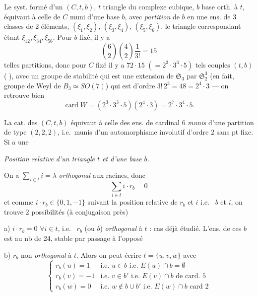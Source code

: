 \documentclass[11pt,a4paper]{article}
\begin{document}

Le syst. formé d'un $(C, t, b)$, $t$ triangle du complexe cubique, $b$ base
orth. à $t$, équivaut à celle de $C$ muni d'une base $b$, avec
\emph{partition} de $b$ en une ens. de 3 classes de 2 éléments,
  $(\xi_1, \xi_2)$, $(\xi_3, \xi_4)$,
$(\xi_5, \xi_6)$, le triangle correspondant étant
$\xi_{12}, \xi_{34}, \xi_{56}$. Pour $b$ fixé, il y a
\[
\binom{6}{2}\binom{4}{2}\frac{1}{3!} = 15
\]
telles partitions, donc pour $C$ fixé il y a $72 \cdot 15$
$(= 2^{3} \cdot 3^{3} \cdot 5)$ tels couples $(t, b)$ \struck{\ill{}}
\struck{\ill{}} (\ill{} \ill{} \ill{} \ill{} \ill{}), avec un groupe de
stabilité qui est une extension de $\mathfrak{S}_3$ par
$\mathfrak{S}_2^{3}$ (en fait, groupe de Weyl de $B_3 \simeq SO(7)$) qui
est d'ordre $3! \, 2^{3} = 48 = 2^{4} \cdot 3$ — on retrouve bien
\[
\operatorname{card} W = (2^{3} \cdot 3^{3} \cdot 5)(2^{4} \cdot 3) = 2^{7} \cdot 3^{4} \cdot 5 .
\]

La cat. des $(C, t, b)$ équivaut à celle des ens. de cardinal 6
\emph{munis} d'une partition de type $(2, 2, 2)$, i.e.\ munis d'un
automorphisme involutif d'ordre 2 sans pt fixe. Si \ill{} a une
\ill{} 


\emph{Position relative d'un triangle $t$ et d'une base $b$.}

On a $\sum_{i \in t} i = \lambda$ \emph{orthogonal} aux racines, donc
\[
\sum_{i \in t} i \cdot r_b = 0
\]
et comme $i \cdot r_b \in \lbrace 0, 1, -1 \rbrace$ suivant la position
relative de $r_b$ et $i$ i.e.\  $b$ et $i$, on trouve 2
possibilités (à conjugaison près)

a) $i \cdot r_b = 0$ $\forall i \in t$, i.e.\  $r_b$ (ou $b$)
\emph{orthogonal} à $t$ : cas déjà étudié. L'ens. de ces $b$ est au nb de
24, stable par passage à l'opposé

b) \struck{$\exists$} $r_b$ non \emph{orthogonal} à $t$. Alors on peut
écrire $t = \lbrace u, v, w \rbrace$ avec
\[
\begin{cases}
r_b(u) = 1 & \text{i.e. } u \in b \text{ i.e. } E(u) \cap b = \emptyset \\
r_b(v) = -1 & \text{i.e. } v \in b' \text{ i.e. } E(v) \cap b \text{ de card. } 5 \\
r_b(w) = 0 & \text{i.e. } w \notin b \cup b' \text{ i.e. } E(w) \cap b \text{ card } 2
\end{cases}
\]
\end{document}
